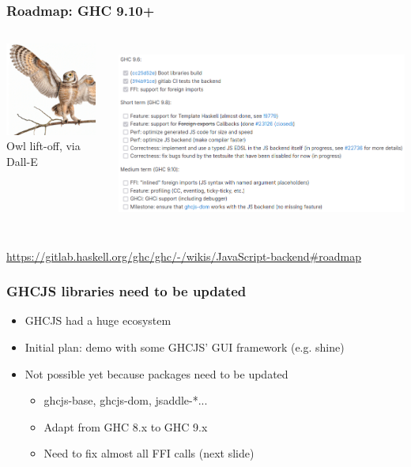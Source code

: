 \documentclass[aspectratio=169]{beamer}
\begin{document}
\begin{frame}
\frametitle{Roadmap: GHC 9.10+}
\begin{columns}

\begin{column}{0.25\textwidth}
\begin{center}
\includegraphics[width=3cm]{images/owl4.png}\\
\tiny Owl lift-off, via Dall-E
\end{center}
\end{column}

\begin{column}{0.7\textwidth}
\includegraphics[height=6cm]{images/roadmap.png}
\end{column}

\end{columns}

\begin{center}
\url{https://gitlab.haskell.org/ghc/ghc/-/wikis/JavaScript-backend\#roadmap}
\end{center}

\end{frame}



\begin{frame}
\frametitle{GHCJS libraries need to be updated}

\begin{itemize}
\item GHCJS had a huge ecosystem
\item Initial plan: demo with some GHCJS' GUI framework (e.g. shine)
\item Not possible yet because packages need to be updated
\begin{itemize}
\item ghcjs-base, ghcjs-dom, jsaddle-*...
\item Adapt from GHC 8.x to GHC 9.x
\item Need to fix almost all FFI calls (next slide)
\end{itemize}
\end{itemize}
\end{frame}
\end{document}
